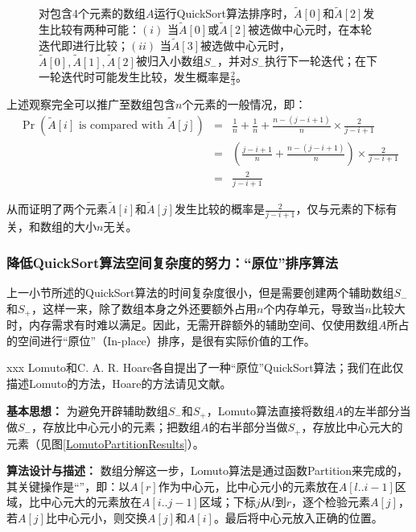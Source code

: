 \begin{enumerate}[(1)]
\begin{figure}[H]
\begin{tikzpicture}[scale=1, auto,swap]
\end{tikzpicture}

\caption{\fangsong 对包含4个元素的数组$A$运行{\sc QuickSort}算法排序时，$\tilde{A}[0]$和$\tilde{A}[2]$发生比较有两种可能：$(i)$ 当$\tilde{A}[0]$或$\tilde{A}[2]$被选做中心元时，在本轮迭代即进行比较；$(ii)$ 当$\tilde{A}[3]$被选做中心元时，$\tilde{A}[0], \tilde{A}[1], \tilde{A}[2]$被归入小数组$S_{-}$，并对$S_{-}$执行下一轮迭代；在下一轮迭代时可能发生比较，发生概率是$\frac{2}{3}$。}
\label{compareij4elements}
\end{figure}

\end{enumerate}

上述观察完全可以推广至数组包含$n$个元素的一般情况，即：
\begin{eqnarray}	
 \Pr( \tilde{A}[i]  \text{ is compared with } \tilde{A}[j] )  &=&  \frac{1}{n} + \frac{1}{n} +  \frac{n-(j-i+1)}{n} \times  \frac{2}{j-i+1}  \nonumber\\ 
 &=&  (\frac{j-i+1}{n} +  \frac{n-(j-i+1)}{n}) \times  \frac{2}{j-i+1}   \nonumber\\
 &=&  \frac{2}{j-i+1}\nonumber
 \end{eqnarray}

从而证明了两个元素$\tilde{A}[i]$和$\tilde{A}[j]$发生比较的概率是$\frac{2}{j-i+1}$，仅与元素的下标有关，和数组的大小$n$无关。

\subsubsection*{降低{\sc QuickSort}算法空间复杂度的努力：“原位”排序算法}
	上一小节所述的{\sc QuickSort}算法的时间复杂度很小，但是需要创建两个辅助数组$S_{-}$和$S_{+}$，这样一来，除了数组本身之外还要额外占用$n$个内存单元，导致当$n$比较大时，内存需求有时难以满足。因此，无需开辟额外的辅助空间、仅使用数组$A$所占的空间进行“原位”（In-place）排序，是很有实际价值的工作。
	
	xxx Lomuto和C. A. R. Hoare各自提出了一种“原位”{\sc QuickSort}算法；我们在此仅描述Lomuto的方法\cite{LomutoInPlaceQuickSort}，Hoare的方法请见文献\cite{HoareInPlaceQuickSort}。
	
	{\bf 基本思想：} 为避免开辟辅助数组$S_{-}$和$S_{+}$，{\sc Lomuto}算法直接将数组$A$的左半部分当做$S_{-}$，存放比中心元小的元素；把数组$A$的右半部分当做$S_{+}$，存放比中心元大的元素（见图\ref{LomutoPartitionResults}）。
	
	{\bf 算法设计与描述：} 数组分解这一步，{\sc Lomuto}算法是通过函数{\sc Partition}来完成的，其关键操作是“”，即：以$A[r]$作为中心元，比中心元小的元素放在$A[l..i-1]$区域，比中心元大的元素放在$A[i..j-1]$区域；下标$j$从$l$到$r$，逐个检验元素$A[j]$，若$A[j]$比中心元小，则交换$A[j]$和$A[i]$。最后将中心元放入正确的位置。
	

